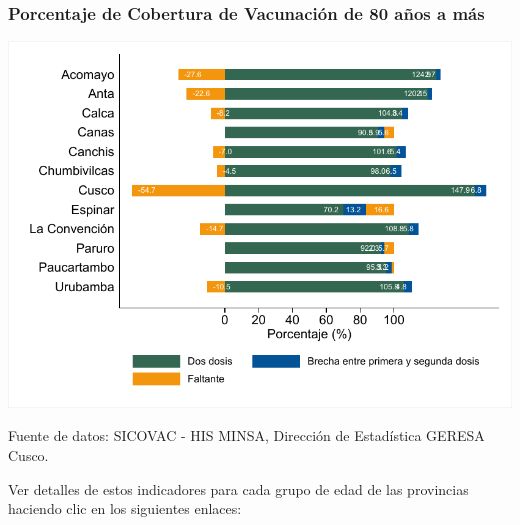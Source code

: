 \documentclass[xcolor=table]{beamer}
\begin{document}
\begin{frame}[label=cobertura_vacuna_provincias]
	\frametitle{Porcentaje de Cobertura de Vacunación de 80 años a más}
	\vspace{-.5cm}
	\begin{center}
		\includegraphics[width=0.7\linewidth, trim={.2cm .5cm .2cm .2cm},clip]{../figuras/vacunacion_provincial_edad_8.pdf}
	\end{center}
	{\tiny Fuente de datos: SICOVAC - HIS MINSA, Dirección de Estadística GERESA Cusco.} \hyperlink{indice}{}
	
	Ver detalles de estos indicadores para cada grupo de edad de las provincias haciendo clic en los siguientes enlaces:
	\hyperlink{vacunas_90}{}
	\hyperlink{vacunas_80}{}
	\hyperlink{vacunas_70}{}
	\hyperlink{vacunas_60}{} \hyperlink{vacunas_50}{} \hyperlink{vacunas_40}{} \hyperlink{vacunas_30}{}
	\hyperlink{vacunas_20}{} \hyperlink{vacunas_10}{}
	
\end{frame}



\end{document}
